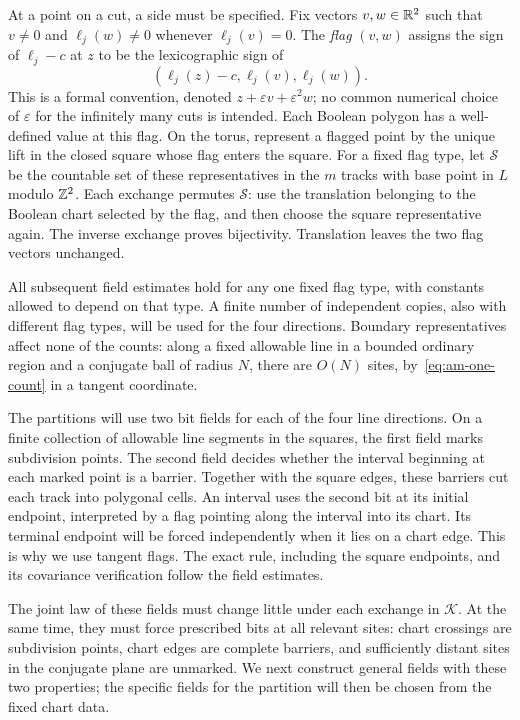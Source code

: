 At a point on a cut, a side must be specified.  Fix vectors $v,w\in\mathbb R^2$
such that $v\ne0$ and $\ell_j(w)\ne0$ whenever $\ell_j(v)=0$.  The
\emph{flag} $(v,w)$ assigns the sign of $\ell_j-c$ at $z$ to be the
lexicographic sign of
\[
 (\ell_j(z)-c,\ell_j(v),\ell_j(w)).
\]
This is a formal convention, denoted $z+\varepsilon v+\varepsilon^2w$;
no common numerical choice of $\varepsilon$ for the infinitely many cuts is
intended.  Each Boolean polygon has a well-defined value at this flag.
On the torus, represent a flagged point by the unique lift in the closed
square whose flag enters the square.  For a fixed flag type, let $\mathcal S$
be the countable set of these representatives in the $m$ tracks with base
point in $L$ modulo $\mathbb Z^2$.  Each exchange permutes $\mathcal S$: use the
translation belonging to the Boolean chart selected by the flag, and then
choose the square representative again.  The inverse exchange proves
bijectivity.  Translation leaves the two flag vectors unchanged.

All subsequent field estimates hold for any one fixed flag type, with
constants allowed to depend on that type.  A finite number of independent
copies, also with different flag types, will be used for the four directions.
Boundary representatives affect none of the counts: along a fixed allowable
line in a bounded ordinary region and a conjugate ball of radius $N$, there
are $O(N)$ sites, by~\eqref{eq:am-one-count} in a tangent coordinate.

The partitions will use two bit fields for each of the four line directions.
On a finite collection of allowable line segments in the squares, the first
field marks subdivision points.  The second field decides whether the
interval beginning at each marked point is a barrier.  Together with the
square edges, these barriers cut each track into polygonal cells.  An
interval uses the second bit at its initial endpoint, interpreted by a flag
pointing along the interval into its chart.  Its terminal endpoint will be
forced independently when it lies on a chart edge.  This is why we use
tangent flags.  The exact rule, including the square endpoints, and its
covariance verification follow the field estimates.

The joint law of these fields must change little under each exchange in
$\mathcal K$.  At the same time, they must force prescribed bits at all
relevant sites: chart crossings are subdivision points, chart edges are
complete barriers, and sufficiently distant sites in the conjugate plane
are unmarked.  We next construct general fields with these two properties;
the specific fields for the partition will then be chosen from the fixed
chart data.

